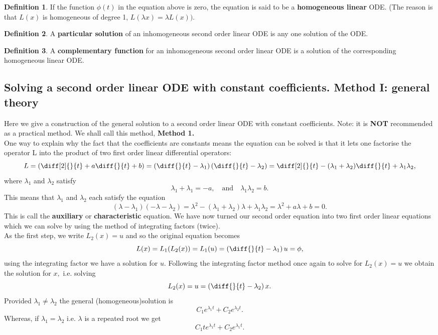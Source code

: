 \documentclass[12pt, a4paper]{article}
\theoremstyle{definition}
\newtheorem{definition}{Definition}[section]
\theoremstyle{plain}
\begin{document}
\begin{definition}
If the function $\phi(t)$ in the equation above is zero, the equation is said to be a \textbf{homogeneous linear} ODE. (The reason is that $L(x)$ is homogeneous of degree 1, $L(\lambda x) = \lambda L(x)).$
\end{definition}

\begin{definition}
A \textbf{particular solution} of an inhomogeneous second order linear ODE is any one solution of the ODE.
\end{definition}

\begin{definition}
A \textbf{complementary function} for an inhomogeneous second order linear ODE is a solution of the corresponding homogeneous linear ODE.
\end{definition}

\subsection{Solving a second order linear ODE with constant coefficients. Method I: general theory}

Here we give a construction of the general solution to a second order linear ODE with constant coefficients. Note: it is \textbf{NOT} recommended as a practical method. We shall call this method, \textbf{Method 1.} \\ 
One way to explain why the fact that the coefficients are constants means the equation can be solved is that it lets one factorise the operator L into the product of two first order linear differential operators: $$L=\left(\diff[2]{}{t}+a\diff{}{t}+b\right)=\left(\diff{}{t}-\lambda_1\right)\left(\diff{}{t}-\lambda_2\right) = \diff[2]{}{t}-(\lambda_1+\lambda_2)\diff{}{t}+\lambda_1\lambda_2,$$ where $\lambda_1$ and $\lambda_2$ satisfy $$\lambda_1+\lambda_1 = -a, \quad \text{and} \quad \lambda_1\lambda_2=b.$$ This means that $\lambda_1$ and $\lambda_2$ each satisfy the equation $$(\lambda-\lambda_1)(-\lambda-\lambda_2)=\lambda^2-(\lambda_1+\lambda_2)\lambda +\lambda_1\lambda_2= \lambda^2+a\lambda+b=0.$$ This is call the \textbf{auxiliary} or \textbf{characteristic} equation. We have now turned our second order equation into two first order linear equations which we can solve by using the method of integrating factors (twice). \\
As the first step, we write $L_2(x) = u$ and so the original equation becomes $$L(x)=L_1(L_2(x))=L_1(u)=\left(\diff{}{t}-\lambda_1\right)u = \phi,$$ using the integrating factor we have a solution for $u.$ Following the integrating factor method once again to solve for $L_2(x) = u$ we obtain the solution for $x,$ i.e. solving $$L_2(x)=u=\left(\diff{}{t}-\lambda_2\right)x.$$ Provided $\lambda_1 \neq \lambda_2$ the general (homogeneous)solution is $$C_1e^{\lambda_1t}+C_2e^{\lambda_2t}.$$ Whereas, if $\lambda_1=\lambda_2$ i.e. $\lambda$ is a repeated root we get $$C_1te^{\lambda_1t}+C_2e^{\lambda_1t}.$$
\end{document}
